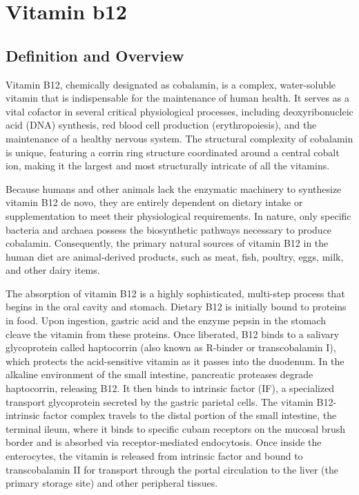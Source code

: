\chapter{Vitamin b12}

\section*{Definition and Overview}
Vitamin B12, chemically designated as cobalamin, is a complex, water-soluble vitamin that is indispensable for the maintenance of human health. It serves as a vital cofactor in several critical physiological processes, including deoxyribonucleic acid (DNA) synthesis, red blood cell production (erythropoiesis), and the maintenance of a healthy nervous system. The structural complexity of cobalamin is unique, featuring a corrin ring structure coordinated around a central cobalt ion, making it the largest and most structurally intricate of all the vitamins.

Because humans and other animals lack the enzymatic machinery to synthesize vitamin B12 de novo, they are entirely dependent on dietary intake or supplementation to meet their physiological requirements. In nature, only specific bacteria and archaea possess the biosynthetic pathways necessary to produce cobalamin. Consequently, the primary natural sources of vitamin B12 in the human diet are animal-derived products, such as meat, fish, poultry, eggs, milk, and other dairy items.

The absorption of vitamin B12 is a highly sophisticated, multi-step process that begins in the oral cavity and stomach. Dietary B12 is initially bound to proteins in food. Upon ingestion, gastric acid and the enzyme pepsin in the stomach cleave the vitamin from these proteins. Once liberated, B12 binds to a salivary glycoprotein called haptocorrin (also known as R-binder or transcobalamin I), which protects the acid-sensitive vitamin as it passes into the duodenum. In the alkaline environment of the small intestine, pancreatic proteases degrade haptocorrin, releasing B12. It then binds to intrinsic factor (IF), a specialized transport glycoprotein secreted by the gastric parietal cells. The vitamin B12-intrinsic factor complex travels to the distal portion of the small intestine, the terminal ileum, where it binds to specific cubam receptors on the mucosal brush border and is absorbed via receptor-mediated endocytosis. Once inside the enterocytes, the vitamin is released from intrinsic factor and bound to transcobalamin II for transport through the portal circulation to the liver (the primary storage site) and other peripheral tissues.

